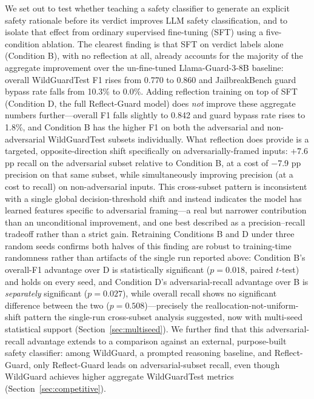 \documentclass[Superintelligence,article,submit,pdftex,moreauthors]{Definitions/mdpi}
\begin{document}
We set out to test whether teaching a safety classifier to generate an explicit safety rationale before its verdict improves LLM safety classification, and to isolate that effect from ordinary supervised fine-tuning (SFT) using a five-condition ablation. The clearest finding is that SFT on verdict labels alone (Condition B), with no reflection at all, already accounts for the majority of the aggregate improvement over the un-fine-tuned Llama-Guard-3-8B baseline: overall WildGuardTest F1 rises from 0.770 to 0.860 and JailbreakBench guard bypass rate falls from 10.3\% to 0.0\%. Adding reflection training on top of SFT (Condition D, the full Reflect-Guard model) does \emph{not} improve these aggregate numbers further---overall F1 falls slightly to 0.842 and guard bypass rate rises to 1.8\%, and Condition B has the higher F1 on both the adversarial and non-adversarial WildGuardTest subsets individually. What reflection does provide is a targeted, opposite-direction shift specifically on adversarially-framed inputs: +7.6 pp recall on the adversarial subset relative to Condition B, at a cost of $-$7.9 pp precision on that same subset, while simultaneously improving precision (at a cost to recall) on non-adversarial inputs. This cross-subset pattern is inconsistent with a single global decision-threshold shift and instead indicates the model has learned features specific to adversarial framing---a real but narrower contribution than an unconditional improvement, and one best described as a precision--recall tradeoff rather than a strict gain. Retraining Conditions B and D under three random seeds confirms both halves of this finding are robust to training-time randomness rather than artifacts of the single run reported above: Condition B's overall-F1 advantage over D is statistically significant ($p=0.018$, paired $t$-test) and holds on every seed, and Condition D's adversarial-recall advantage over B is \emph{separately} significant ($p=0.027$), while overall recall shows no significant difference between the two ($p=0.508$)---precisely the reallocation-not-uniform-shift pattern the single-run cross-subset analysis suggested, now with multi-seed statistical support (Section~\ref{sec:multiseed}). We further find that this adversarial-recall advantage extends to a comparison against an external, purpose-built safety classifier: among WildGuard, a prompted reasoning baseline, and Reflect-Guard, only Reflect-Guard leads on adversarial-subset recall, even though WildGuard achieves higher aggregate WildGuardTest metrics (Section~\ref{sec:competitive}).
\end{document}
